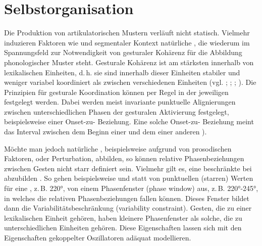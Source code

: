 \chapter{Selbstorganisation}
\label{chap:03}

Die Produktion von artikulatorischen Mustern verläuft nicht statisch. Vielmehr induzieren Faktoren wie  und segmentaler Kontext natürliche , die wiederum im Spannungsfeld zur Notwendigkeit von gesturaler Kohärenz für die Abbildung phonologischer Muster steht. Gesturale Kohärenz ist am stärksten innerhalb von lexikalischen Einheiten, d.\,h. sie sind innerhalb dieser Einheiten stabiler und weniger variabel koordiniert als zwischen verschiedenen Einheiten (vgl. \citealt{Saltzman2000}; \citealt{Goldstein2006}; \citealt{Goldstein2009}; \citealt{Yoon2011}). Die Prinzipien für gesturale Koordination können per Regel in der jeweiligen  festgelegt werden. Dabei werden meist invariante punktuelle Alignierungen zwischen unterschiedlichen Phasen der gesturalen Aktivierung festgelegt, beispielsweise einer Onset-zu- Beziehung. Eine solche Onset-zu- Beziehung meint das Interval zwischen dem Beginn einer  und dem  einer anderen  \citealt{Saltzman2000}). 

Möchte man jedoch natürliche , beispielsweise aufgrund von prosodischen Faktoren,  oder Perturbation, abbilden, so können relative Phasenbeziehungen zwischen Gesten nicht starr definiert sein. Vielmehr gilt es, eine beschränkte  bei  abzubilden \citep[vgl.][]{Saltzman2000,Goldstein2006,Nam2009a}. So gehen beispielsweise \citet{Byrd1996a} und \citet[][54]{Saltzman2000} statt von punktuellen (starren) Werten für eine , z.\,B. 220°, von einem Phasenfenster (phase window) aus, z.\,B. 220°-245°, in welches die relativen Phasenbeziehungen fallen können. Dieses Fenster bildet dann die Variabilitätsbeschränkung (variability constraint). Gesten, die zu einer lexikalischen Einheit gehören, haben kleinere Phasenfenster als solche, die zu unterschiedlichen Einheiten gehören. Diese Eigenschaften lassen sich mit den Eigenschaften gekoppelter Oszillatoren adäquat modellieren.

